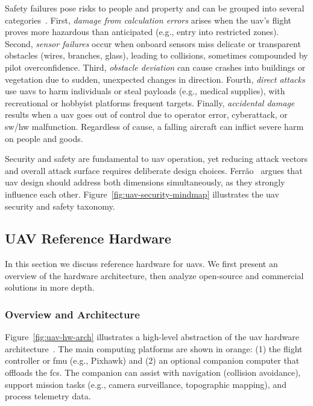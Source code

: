 Safety failures pose risks to people and property and can be grouped into
several categories~\cite{ferrao2020stuart}.
First, \emph{damage from calculation errors} arises when the \gls{uav}'s flight
proves more hazardous than anticipated (e.g., entry into restricted zones).
Second, \emph{sensor failures} occur when onboard sensors miss delicate or
transparent obstacles (wires, branches, glass), leading to collisions, sometimes
compounded by pilot overconfidence.
Third, \emph{obstacle deviation} can cause crashes into buildings or vegetation
due to sudden, unexpected changes in direction.
Fourth, \emph{direct attacks} use \glspl{uav} to harm individuals or steal
payloads (e.g., medical supplies), with recreational or hobbyist platforms
frequent targets.
Finally, \emph{accidental damage} results when a \gls{uav} goes out of control
due to operator error, cyberattack, or \gls{sw}/\gls{hw} malfunction.
Regardless of cause, a falling aircraft can inflict severe harm on people and
goods.

Security and safety are fundamental to \gls{uav} operation, yet reducing attack
vectors and overall attack surface requires deliberate design choices.
Ferrão~\cite{ferrao2020stuart} argues that \gls{uav} design should address both dimensions simultaneously, as they strongly influence each other. 
Figure~\ref{fig:uav-security-mindmap} illustrates the \gls{uav} security and safety taxonomy.

\subsection{UAV Reference Hardware}%
\label{sec:uav-ref-hw}
In this section we discuss reference hardware for \glspl{uav}. 
We first present an overview of the hardware architecture, then analyze open-source and commercial solutions in more depth.

\subsubsection{Overview and Architecture}%
\label{sec:overv-arch-hw}
Figure~\ref{fig:uav-hw-arch} illustrates a high-level abstraction of the \gls{uav} hardware architecture~\cite{leccadito2018survey,px4-sysArch}. 
The main computing platforms are shown in orange: (1) the flight controller or \gls{fmu} (e.g., Pixhawk) and (2) an optional companion computer that offloads the \gls{fcs}. 
The companion can assist with navigation (collision avoidance), support mission tasks (e.g., camera surveillance, topographic mapping), and process telemetry data.

